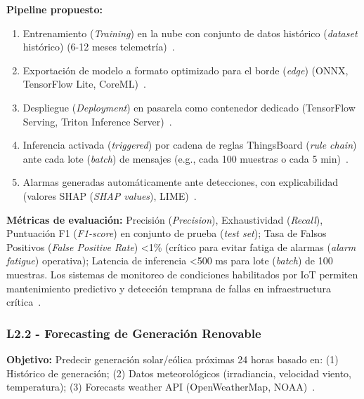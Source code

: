 \textbf{Pipeline propuesto:}
\begin{enumerate}
\item Entrenamiento (\textit{Training}) en la nube con conjunto de datos histórico (\textit{dataset} histórico) (6-12 meses telemetría)~\cite{miglaniDeepLearningModels2022}.
\item Exportación de modelo a formato optimizado para el borde (\textit{edge}) (ONNX, TensorFlow Lite, CoreML)~\cite{shenAugmentingEdgeIntelligence2024}.
\item Despliegue (\textit{Deployment}) en pasarela como contenedor dedicado (TensorFlow Serving, Triton Inference Server)~\cite{perezImplicationSoftwareContainerization2024}.
\item Inferencia activada (\textit{triggered}) por cadena de reglas ThingsBoard (\textit{rule chain}) ante cada lote (\textit{batch}) de mensajes (e.g., cada 100 muestras o cada 5 min)~\cite{huangDataProcessingEnhancement2025}.
\item Alarmas generadas automáticamente ante detecciones, con explicabilidad (valores SHAP (\textit{SHAP values}), LIME)~\cite{ayaUnleashingIntelligenceEdge2024}.
\end{enumerate}

\textbf{Métricas de evaluación:} Precisión (\textit{Precision}), Exhaustividad (\textit{Recall}), Puntuación F1 (\textit{F1-score}) en conjunto de prueba (\textit{test set}); Tasa de Falsos Positivos (\textit{False Positive Rate}) <1\% (crítico para evitar fatiga de alarmas (\textit{alarm fatigue}) operativa); Latencia de inferencia <500 ms para lote (\textit{batch}) de 100 muestras. Los sistemas de monitoreo de condiciones habilitados por IoT permiten mantenimiento predictivo y detección temprana de fallas en infraestructura crítica~\cite{masterofengineeringm.e.electricalandelectronicsengineeringlamaruniversityusaIOTENABLEDCONDITIONMONITORING2025}.

\subsubsection{L2.2 - Forecasting de Generación Renovable}

\textbf{Objetivo:} Predecir generación solar/eólica próximas 24 horas basado en: (1) Histórico de generación; (2) Datos meteorológicos (irradiancia, velocidad viento, temperatura); (3) Forecasts weather API (OpenWeatherMap, NOAA)~\cite{dentremontDeepLearningDataset2024,kumariEdgeComputingData2024}.


